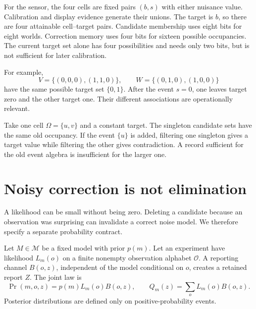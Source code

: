 For the sensor, the four cells are fixed pairs $(b,s)$ with either nuisance value. Calibration and display evidence generate their unions. The target is $b$, so there are four attainable cell--target pairs. Candidate membership uses eight bits for eight worlds. Correction memory uses four bits for sixteen possible occupancies. The current target set alone has four possibilities and needs only two bits, but is not sufficient for later calibration.

For example,
\[
V=\{(0,0,0),(1,1,0)\},\qquad W=\{(0,1,0),(1,0,0)\}
\]
have the same possible target set $\{0,1\}$. After the event $s=0$, one leaves target zero and the other target one. Their different associations are operationally relevant.

\begin{counterexample}\label{ce:split}
Take one cell $\Omega=\{u,v\}$ and a constant target. The singleton candidate sets have the same old occupancy. If the event $\{u\}$ is added, filtering one singleton gives a target value while filtering the other gives contradiction. A record sufficient for the old event algebra is insufficient for the larger one.
\end{counterexample}

\section{Noisy correction is not elimination}
A likelihood can be small without being zero. Deleting a candidate because an observation was surprising can invalidate a correct noise model. We therefore specify a separate probability contract.

Let $M\in\mathcal M$ be a fixed model with prior $p(m)$. Let an experiment have likelihood $L_m(o)$ on a finite nonempty observation alphabet $\mathcal O$. A reporting channel $B(o,z)$, independent of the model conditional on $o$, creates a retained report $Z$. The joint law is
\[
\Pr(m,o,z)=p(m)L_m(o)B(o,z),\qquad Q_m(z)=\sum_oL_m(o)B(o,z).
\]
Posterior distributions are defined only on positive-probability events.

